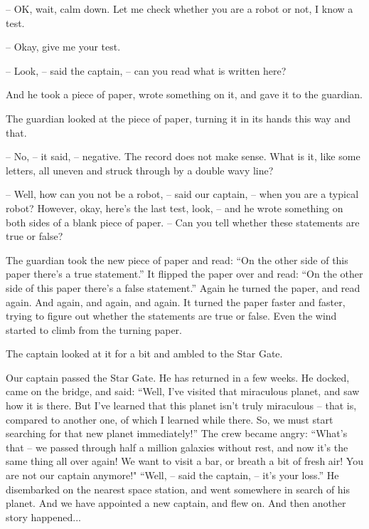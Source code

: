 \documentclass[ebook,twoside,final,openright]{memoir}
\begin{document}
– OK, wait, calm down. Let me check whether you are a robot or not, I know a test.\par
– Okay, give me your test.\par
– Look, – said the captain, – can you read what is written here?\par
And he took a piece of paper, wrote something on it, and gave it to the guardian.\par
The guardian looked at the piece of paper, turning it in its hands this way and that.\par
– No, – it said, – negative. The record does not make sense. What is it, like some letters, all uneven and struck through by a double wavy line?\par
– Well, how can you not be a robot, – said our captain, – when you are a typical robot? However, okay, here's the last test, look, – and he wrote something on both sides of a blank piece of paper. – Can you tell whether these statements are true or false?\par
\par
The guardian took the new piece of paper and read: “On the other side of this paper there’s a true statement.” It flipped the paper over and read: “On the other side of this paper there’s a false statement.” Again he turned the paper, and read again. And again, and again, and again. It turned the paper faster and faster, trying to figure out whether the statements are true or false. Even the wind started to climb from the turning paper.\par
\par
The captain looked at it for a bit and ambled to the Star Gate.\par
Our captain passed the Star Gate. He has returned in a few weeks. He docked, came on the bridge, and said: “Well, I’ve visited that miraculous planet, and saw how it is there. But I’ve learned that this planet isn’t truly miraculous – that is, compared to another one, of which I learned while there. So, we must start searching for that new planet immediately!” The crew became angry: “What’s that – we passed through half a million galaxies without rest, and now it’s the same thing all over again! We want to visit a bar, or breath a bit of fresh air! You are not our captain anymore!" “Well, – said the captain, – it’s your loss.” He disembarked on the nearest space station, and went somewhere in search of his planet. And we have appointed a new captain, and flew on. And then another story happened...
\end{document}
